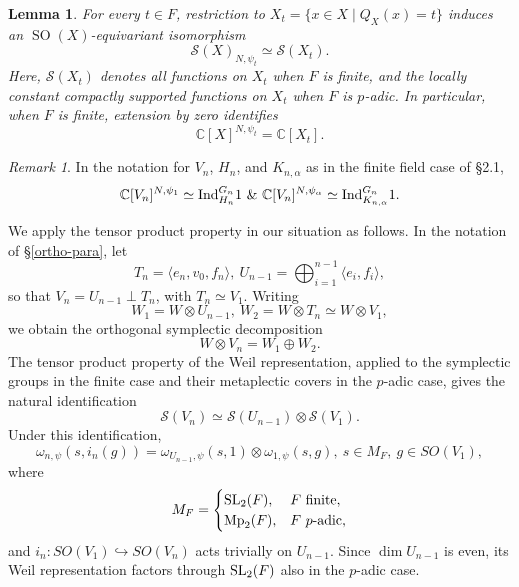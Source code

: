 \documentclass[12pt]{amsart}
\newtheorem{lemma}[theorem]{Lemma}%
\theoremstyle{definition}
\theoremstyle{remark}
\newtheorem{remark}{Remark}
\begin{document}
\begin{lemma}\label{lemma-norm}
For every $t\in F$, restriction to
$X_t=\{x\in X \mid Q_X(x)=t\}$ induces an
$\operatorname{SO}(X)$-equivariant isomorphism
\[
\mathcal S(X)_{N,\psi_t}\simeq\mathcal S(X_t).
\]
Here, $\mathcal S(X_t)$ denotes all functions on $X_t$ when
$F$ is finite, and the locally constant compactly supported
functions on $X_t$ when $F$ is $p$-adic.
In particular, when $F$ is finite, extension by zero identifies
\[
\mathbb C[X]^{N,\psi_t}=\mathbb C[X_t].
\]
\end{lemma}

\begin{remark}\label{rmk-norm}
In the notation for $V_n$, $H_n$, and
$K_{n,\alpha}$ as in the finite field case of \S 2.1,
\[
\mathbb C[V_n]^{N,\psi_1}
\simeq {\rm Ind}_{H_n}^{G_n} 1 ~\&~
\mathbb C[V_n]^{N,\psi_\alpha}
\simeq {\rm Ind}_{K_{n,\alpha}}^{G_n} 1.
\]
\end{remark}

We apply the tensor product property in our situation as follows.
In the notation of \S\ref{ortho-para}, let
\begin{equation}\label{directsum}
T_n=\langle e_n,v_0,f_n\rangle,~
U_{n-1}=\bigoplus_{i=1}^{n-1}\langle e_i,f_i\rangle,
\end{equation}
so that $V_n=U_{n-1}\perp T_n$, with $T_n\simeq V_1$.
Writing
\[
W_1=W\otimes U_{n-1},~
W_2=W\otimes T_n\simeq W\otimes V_1,
\]
we obtain the orthogonal symplectic decomposition
\[
W\otimes V_n=W_1\oplus W_2.
\]
The tensor product property of the Weil representation,
applied to the symplectic groups in the finite case
and their metaplectic covers in the $p$-adic case,
gives the natural identification
\begin{equation}\label{eq-tensor}
\mathcal S(V_n)
\simeq\mathcal S(U_{n-1})\otimes\mathcal S(V_1).
\end{equation}
Under this identification,
\begin{equation}\label{tensor}
\omega_{n,\psi}(s,i_n(g))
=
\omega_{U_{n-1},\psi}(s,1)
\otimes\omega_{1,\psi}(s,g),~
s\in M_F, ~g\in SO(V_1),
\end{equation}
where 
\[
M_F=
\begin{cases}
{\rm SL}_2(F),&F\text{ finite},\\
{\rm Mp}_2(F),&F\text{ $p$-adic},
\end{cases}
\]
and
$i_n:SO(V_1)\hookrightarrow SO(V_n)$ acts trivially
on $U_{n-1}$.
Since $\dim U_{n-1}$ is even, its Weil representation
factors through ${\rm SL}_2(F)$ also in the $p$-adic case.
\end{document}
